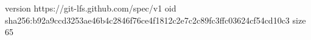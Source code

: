 version https://git-lfs.github.com/spec/v1
oid sha256:b92a9ccd3253ae46b4c2846f76ce4f1812c2e7c2c89fc3ffc03624cf54cd10c3
size 65
